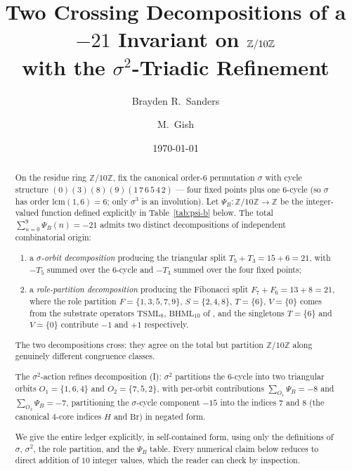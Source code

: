 \documentclass[11pt,reqno]{amsart}
\title[$\sigma^{2}$-Triadic Decomposition on $\Z/10\Z$]
{Two Crossing Decompositions of a $-21$ Invariant on $\Z/10\Z$ \\
 with the $\sigma^{2}$-Triadic Refinement}
\author{Brayden R.\ Sanders}
\author{M.\ Gish}
\date{\today}
\theoremstyle{plain}
\theoremstyle{definition}
\theoremstyle{remark}
\newcommand{\Z}{\mathbb{Z}}
\newcommand{\TS}{\mathrm{TSML}}
\newcommand{\BH}{\mathrm{BHML}}
\newcommand{\sig}{\sigma}
\begin{document}
\begin{abstract}
On the residue ring $\Z/10\Z$, fix the canonical order-$6$ permutation
$\sig$ with cycle structure $(0)(3)(8)(9)(1\,7\,6\,5\,4\,2)$ --- four
fixed points plus one $6$-cycle (so $\sig$ has order $\mathrm{lcm}(1,6)
= 6$; only $\sig^{3}$ is an involution). Let $\Psi_{B} : \Z/10\Z \to \Z$ be the integer-valued function
defined explicitly in Table~\ref{tab:psi-b} below.
The total $\sum_{n=0}^{9} \Psi_{B}(n) = -21$ admits two distinct
decompositions of independent combinatorial origin:
\begin{enumerate}
\item[(I)] a \emph{$\sig$-orbit decomposition} producing the triangular
split $T_5 + T_3 = 15 + 6 = 21$, with $-T_5$ summed over the $6$-cycle
and $-T_3$ summed over the four fixed points;
\item[(II)] a \emph{role-partition decomposition} producing the Fibonacci
split $F_7 + F_6 = 13 + 8 = 21$, where the role partition
$F = \{1,3,5,7,9\}$, $S = \{2,4,8\}$, $T = \{6\}$, $V = \{0\}$ comes from
the substrate operators $\TS_{8}$, $\BH_{10}$ of \cite{SandersGishFourCore},
and the singletons $T = \{6\}$ and $V = \{0\}$ contribute $-1$ and $+1$
respectively.
\end{enumerate}
The two decompositions cross: they agree on the total but partition
$\Z/10\Z$ along genuinely different congruence classes.

The $\sig^{2}$-action refines decomposition (I): $\sig^{2}$ partitions
the $6$-cycle into two triangular orbits $O_{1} = \{1, 6, 4\}$ and
$O_{2} = \{7, 5, 2\}$, with per-orbit contributions
$\sum_{O_1} \Psi_B = -8$ and $\sum_{O_2} \Psi_B = -7$, partitioning
the $\sig$-cycle component $-15$ into the indices $7$ and $8$ (the
canonical $4$-core indices $H$ and $\mathrm{Br}$) in negated form.

We give the entire ledger explicitly, in self-contained form, using
only the definitions of $\sig$, $\sig^{2}$, the role partition, and
the $\Psi_B$ table.  Every numerical claim below reduces to direct
addition of $10$ integer values, which the reader can check by
inspection.
\end{abstract}

\maketitle

\tableofcontents

\end{document}
